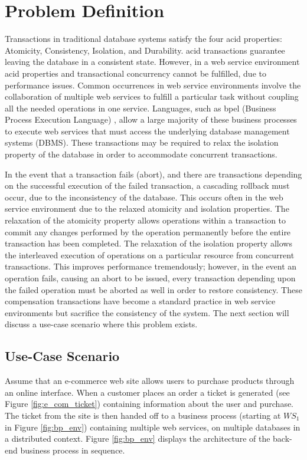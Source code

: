 \section{Problem Definition}
\label{pbs:problem_def}
Transactions in traditional database systems satisfy the four \gls{acid}  properties: Atomicity, Consistency, Isolation, and Durability. \gls{acid} transactions guarantee leaving the database in a consistent state. However, in a web service environment \gls{acid} properties and transactional concurrency cannot be fulfilled, due to performance issues. Common occurrences in web service environments involve the collaboration of multiple web services to fulfill a particular task without coupling all the needed operations in one service. Languages, such as \gls{bpel} (Business Process Execution Language) \cite{BPEL}, allow a large majority of these business processes to execute web services that must access the underlying database management systems (DBMS). These transactions may be required to relax the isolation property of the database in order to accommodate concurrent transactions.

In the event that a transaction fails (abort), and there are transactions depending on the successful execution of the failed transaction, a cascading rollback must occur, due to the inconsistency of the database. This occurs often in the web service environment due to the relaxed atomicity and isolation properties. The relaxation of the atomicity property allows operations within a transaction to commit any changes performed by the operation permanently before the entire transaction has been completed. The relaxation of the isolation property allows the interleaved execution of operations on a particular resource from concurrent transactions. This improves performance tremendously; however, in the event an operation fails, causing an abort to be issued, every transaction depending upon the failed operation must be aborted as well in order to restore consistency. These compensation transactions have become a standard practice in web service environments but sacrifice the consistency of the system. The next section will discuss a use-case scenario where this problem exists.

\subsection{Use-Case Scenario}
\label{subsec:use_case}
Assume that an e-commerce web site allows users to purchase products through an online interface. When a customer places an order a ticket is generated (see Figure \ref{fig:e_com_ticket}) containing information about the user and purchase. The ticket from the site is then handed off to a business process (starting at $WS_{1}$ in Figure \ref{fig:bp_env}) containing multiple web services, on multiple databases in a distributed context. Figure \ref{fig:bp_env} displays the architecture of the back-end business process in sequence.

